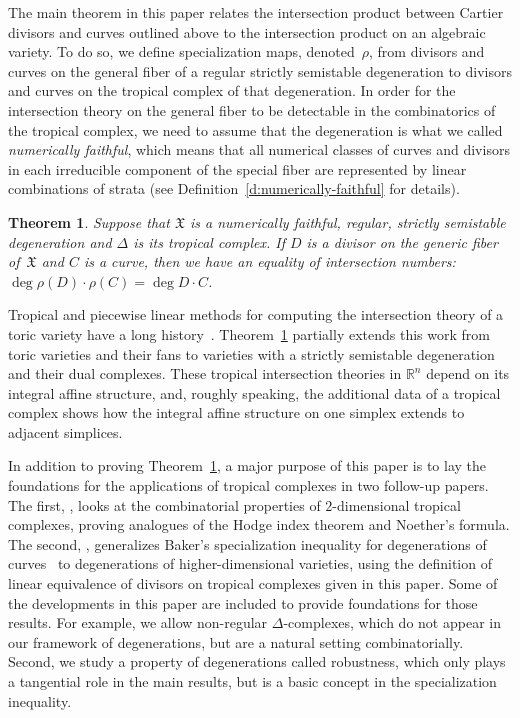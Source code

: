 \documentclass[11pt,reqno]{amsart}
\newtheorem{thm}{Theorem}[section]
\theoremstyle{definition}
\newcommand{\defi}[1]{\emph{#1}}
\newcommand{\RR}{\mathbb R}
\newcommand{\X}{\mathfrak X}
\begin{document}
The main theorem in this paper relates the intersection product between Cartier
divisors and curves outlined above
to the intersection product on an algebraic variety. To do so, we define
specialization maps, denoted~$\rho$, from divisors and curves on the general
fiber of a regular strictly semistable degeneration to divisors and curves on
the tropical complex of that degeneration. In order for the intersection theory
on the general fiber to be detectable in the combinatorics of the tropical
complex, we need to assume that the degeneration is what we called
\defi{numerically faithful}, which means that all numerical classes of curves
and divisors in each irreducible component of the special fiber are represented by
linear combinations of strata (see Definition~\ref{d:numerically-faithful} for
details).
\begin{thm}\label{t:intersect-intro}
Suppose that $\X$ is a numerically faithful, regular, strictly semistable
degeneration and $\Delta$ is its tropical complex. If $D$ is a divisor on the
generic fiber of~$\X$ and $C$ is a curve, then we have an equality of
intersection numbers:
$\deg \rho(D) \cdot \rho(C) = \deg D \cdot C$.
\end{thm}

Tropical and piecewise linear methods for computing the intersection theory
of a toric variety have a long history~\cites{fulton-sturmfels,payne,katz}.
Theorem~\ref{t:intersect-intro} partially extends this work from toric varieties
and their fans to varieties with a strictly semistable degeneration and their
dual complexes. These tropical intersection theories in $\RR^n$ depend on its
integral affine structure, and, roughly speaking, the additional data of a
tropical complex shows how the integral affine structure on one simplex extends
to adjacent simplices.

In addition to proving Theorem~\ref{t:intersect-intro}, a major purpose of this
paper is to lay the foundations for the applications of tropical complexes in
two follow-up papers. The first, \cite{cartwright-surfaces}, looks at the
combinatorial properties of $2$-dimensional tropical complexes, proving
analogues of the Hodge index theorem and Noether's formula. The second,
\cite{cartwright-specialization}, generalizes Baker's specialization inequality
for degenerations of curves~\cite{baker} to degenerations of higher-dimensional
varieties, using the definition of linear equivalence of divisors on tropical
complexes given in this paper. Some of the developments in this paper are
included to provide foundations for those results. For example, we allow
non-regular $\Delta$-complexes, which do not appear in our framework of
degenerations,
but are a natural setting combinatorially. Second, we study a
property of degenerations called robustness, which only plays a tangential role
in the main results, but is a basic concept in the specialization inequality.
\end{document}

